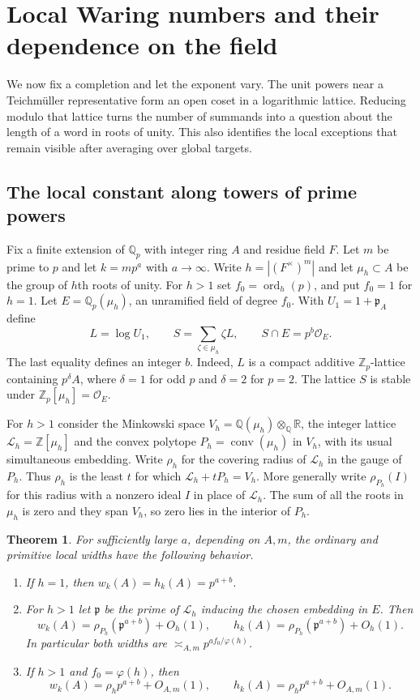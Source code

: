 \documentclass[11pt,letterpaper]{article}
\newtheorem{theorem}{Theorem}[section]
\theoremstyle{definition}
\numberwithin{equation}{section}
\begin{document}
\section{Local Waring numbers and their dependence on the field}
\label{sec:arith-local}
We now fix a completion and let the exponent vary. The unit powers near
a Teichm\"uller representative form an open coset in a logarithmic
lattice. Reducing modulo that lattice turns the number of summands
into a question about the length of a word in roots of unity. This
also identifies the local exceptions that remain visible after averaging
over global targets.

\subsection{The local constant along towers of prime powers}
\label{sec:local-cyclotomic}

Fix a finite extension of $\mathbb Q_p$ with integer ring $A$ and
residue field $F$. Let $m$ be prime to $p$ and let $k=mp^a$ with
$a\to\infty$. Write $h=|(F^\times)^m|$ and let $\mu_h\subset A$ be
the group of $h$th roots of unity. For $h>1$ set
$f_0=\operatorname{ord}_h(p)$, and put $f_0=1$ for $h=1$. Let
$E=\mathbb Q_p(\mu_h)$, an unramified field of degree $f_0$.
With $U_1=1+\mathfrak p_A$ define
\[
       L=\log U_1,\qquad S=\sum_{\zeta\in\mu_h}\zeta L,\qquad
       S\cap E=p^b\mathcal O_E.
\]
The last equality defines an integer $b$. Indeed, $L$ is a compact
additive $\mathbb Z_p$-lattice containing $p^\delta A$, where
$\delta=1$ for odd $p$ and $\delta=2$ for $p=2$. The lattice $S$
is stable under $\mathbb Z_p[\mu_h]=\mathcal O_E$.

For $h>1$ consider the Minkowski space
$V_h=\mathbb Q(\mu_h)\otimes_{\mathbb Q}\mathbb R$, the integer
lattice $\mathcal L_h=\mathbb Z[\mu_h]$ and the convex polytope
$P_h=\operatorname{conv}(\mu_h)$ in $V_h$, with its usual simultaneous
embedding. Write $\rho_h$ for the covering radius of $\mathcal L_h$ in
the gauge of $P_h$. Thus $\rho_h$ is the least $t$ for which
$\mathcal L_h+tP_h=V_h$. More generally write $\rho_{P_h}(I)$
for this radius with a nonzero ideal $I$ in place of $\mathcal L_h$.
The sum of all the roots in $\mu_h$ is zero and they span $V_h$, so
zero lies in the interior of $P_h$.

\begin{theorem}\label{thm:cyclotomic-local}
For sufficiently large $a$, depending on $A,m$, the ordinary and
primitive local widths have the following behavior.
\begin{enumerate}
\item If $h=1$, then $w_k(A)=h_k(A)=p^{a+b}$.
\item For $h>1$ let $\mathfrak p$ be the prime of $\mathcal L_h$
inducing the chosen embedding in $E$. Then
\[
 w_k(A)=\rho_{P_h}(\mathfrak p^{a+b})+O_h(1),\qquad
 h_k(A)=\rho_{P_h}(\mathfrak p^{a+b})+O_h(1).
\]
In particular both widths are $\asymp_{A,m}p^{af_0/\varphi(h)}$.
\item If $h>1$ and $f_0=\varphi(h)$, then
\[
       w_k(A)=\rho_h p^{a+b}+O_{A,m}(1),\qquad
       h_k(A)=\rho_h p^{a+b}+O_{A,m}(1).
\]
\end{enumerate}
\end{theorem}
\end{document}
